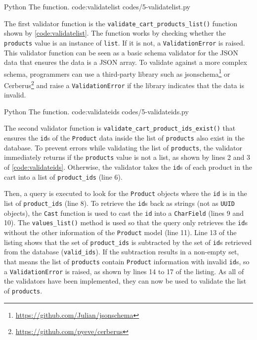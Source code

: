\listing
{Python}
{The  function.}
{code:validatelist}
{codes/5-validatelist.py}

The first validator function is the \verb|validate_cart_products_list()|
function shown by \autoref{code:validatelist}. The function works by checking
whether the \verb|products| value is an instance of \verb|list|. If it is not,
a \verb|ValidationError| is raised. This validator function can be seen as a
basic schema validator for the JSON data that ensures the data is a JSON array.
To validate against a more complex schema, programmers can use a third-party
library such as jsonschema\footnote{\url{https://github.com/Julian/jsonschema}}
or Cerberus\footnote{\url{https://github.com/pyeve/cerberus}} and raise a
\verb|ValidationError| if the library indicates that the data is invalid.

\listing
{Python}
{The  function.}
{code:validateids}
{codes/5-validateids.py}

The second validator function is \verb|validate_cart_product_ids_exist()| that
ensures the \verb|id|s of the \verb|Product| data inside the list of
\verb|products| also exist in the database. To prevent errors while validating
the list of \verb|products|, the validator immediately returns if the
\verb|products| value is not a list, as shown by lines 2 and 3 of
\autoref{code:validateids}. Otherwise, the validator takes the \verb|id|s of
each product in the cart into a list of \verb|product_ids| (line 6).

Then, a query is executed to look for the \verb|Product| objects where the
\verb|id| is in the list of \verb|product_ids| (line 8). To retrieve the
\verb|id|s back as strings (not as \verb|UUID| objects), the \verb|Cast|
function is used to cast the \verb|id| into a \verb|CharField| (lines 9 and
10). The \verb|values_list()| method is used so that the query only retrieves
the \verb|id|s without the other information of the \verb|Product| model (line
11). Line 13 of the listing shows that the set of \verb|product_ids| is
subtracted by the set of \verb|id|s retrieved from the database
(\verb|valid_ids|). If the subtraction results in a non-empty set, that means
the list of \verb|products| contain \verb|Product| information with invalid
\verb|id|s, so a \verb|ValidationError| is raised, as shown by lines 14 to 17
of the listing. As all of the validators have been implemented, they can now be
used to validate the list of \verb|products|.


